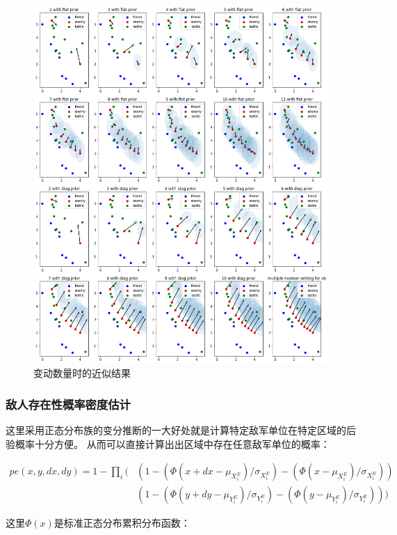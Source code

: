 \documentclass{article}
\begin{document}
\begin{figure}[ht]
\includegraphics[width=0.99\linewidth]{big_vb.png}
\caption{变动数量时的近似结果}
\label{fig:bigVb}
\end{figure}

\subsubsection{敌人存在性概率密度估计}


这里采用正态分布族的变分推断的一大好处就是计算特定敌军单位在特定区域的后验概率十分方便。
从而可以直接计算出出区域中存在任意敌军单位的概率：

\begin{align*}
pe(x,y,dx,dy) = 1 - \prod_i (
& (1-(\Phi(x+dx - \mu_{X^E_i})/\sigma_{X^E_i}) -  (\Phi(x - \mu_{X^E_i})/\sigma_{X^E_i})) \\
& (1-(\Phi(y+dy - \mu_{Y^E_i})/\sigma_{Y^E_i}) -  (\Phi(y - \mu_{Y^E_i})/\sigma_{Y^E_i}))
)
\end{align*}


这里$\Phi(x)$是标准正态分布累积分布函数：
\end{document}
